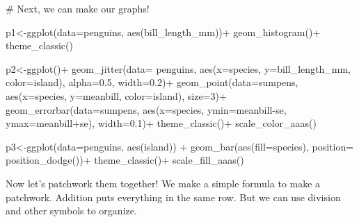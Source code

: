 \documentclass[
  letterpaper,
  DIV=11,
  numbers=noendperiod]{scrartcl}
\newenvironment{Shaded}{\begin{snugshade}}{\end{snugshade}}
\newcommand{\AttributeTok}[1]{\textcolor[rgb]{0.40,0.45,0.13}{#1}}
\newcommand{\CommentTok}[1]{\textcolor[rgb]{0.37,0.37,0.37}{#1}}
\newcommand{\DecValTok}[1]{\textcolor[rgb]{0.68,0.00,0.00}{#1}}
\newcommand{\FloatTok}[1]{\textcolor[rgb]{0.68,0.00,0.00}{#1}}
\newcommand{\FunctionTok}[1]{\textcolor[rgb]{0.28,0.35,0.67}{#1}}
\newcommand{\NormalTok}[1]{\textcolor[rgb]{0.00,0.23,0.31}{#1}}
\newcommand{\OtherTok}[1]{\textcolor[rgb]{0.00,0.23,0.31}{#1}}
\newcommand{\SpecialCharTok}[1]{\textcolor[rgb]{0.37,0.37,0.37}{#1}}
\begin{document}
\begin{Shaded}
\begin{Highlighting}[]
\CommentTok{\# Next, we can make our graphs!}

\NormalTok{p1}\OtherTok{\textless{}{-}}\FunctionTok{ggplot}\NormalTok{(}\AttributeTok{data=}\NormalTok{penguins, }\FunctionTok{aes}\NormalTok{(bill\_length\_mm))}\SpecialCharTok{+}
  \FunctionTok{geom\_histogram}\NormalTok{()}\SpecialCharTok{+}
  \FunctionTok{theme\_classic}\NormalTok{()}


\NormalTok{p2}\OtherTok{\textless{}{-}}\FunctionTok{ggplot}\NormalTok{()}\SpecialCharTok{+}
  \FunctionTok{geom\_jitter}\NormalTok{(}\AttributeTok{data=}\NormalTok{ penguins, }\FunctionTok{aes}\NormalTok{(}\AttributeTok{x=}\NormalTok{species, }\AttributeTok{y=}\NormalTok{bill\_length\_mm, }\AttributeTok{color=}\NormalTok{island), }\AttributeTok{alpha=}\FloatTok{0.5}\NormalTok{, }\AttributeTok{width=}\FloatTok{0.2}\NormalTok{)}\SpecialCharTok{+}
  \FunctionTok{geom\_point}\NormalTok{(}\AttributeTok{data=}\NormalTok{sumpens, }\FunctionTok{aes}\NormalTok{(}\AttributeTok{x=}\NormalTok{species, }\AttributeTok{y=}\NormalTok{meanbill, }\AttributeTok{color=}\NormalTok{island), }\AttributeTok{size=}\DecValTok{3}\NormalTok{)}\SpecialCharTok{+}
  \FunctionTok{geom\_errorbar}\NormalTok{(}\AttributeTok{data=}\NormalTok{sumpens, }\FunctionTok{aes}\NormalTok{(}\AttributeTok{x=}\NormalTok{species, }\AttributeTok{ymin=}\NormalTok{meanbill}\SpecialCharTok{{-}}\NormalTok{se, }\AttributeTok{ymax=}\NormalTok{meanbill}\SpecialCharTok{+}\NormalTok{se), }\AttributeTok{width=}\FloatTok{0.1}\NormalTok{)}\SpecialCharTok{+}
  \FunctionTok{theme\_classic}\NormalTok{()}\SpecialCharTok{+}
  \FunctionTok{scale\_color\_aaas}\NormalTok{()}

\NormalTok{p3}\OtherTok{\textless{}{-}}\FunctionTok{ggplot}\NormalTok{(}\AttributeTok{data=}\NormalTok{penguins, }\FunctionTok{aes}\NormalTok{(island)) }\SpecialCharTok{+}
  \FunctionTok{geom\_bar}\NormalTok{(}\FunctionTok{aes}\NormalTok{(}\AttributeTok{fill=}\NormalTok{species), }\AttributeTok{position=} \FunctionTok{position\_dodge}\NormalTok{())}\SpecialCharTok{+}
  \FunctionTok{theme\_classic}\NormalTok{()}\SpecialCharTok{+}
  \FunctionTok{scale\_fill\_aaas}\NormalTok{()}
\end{Highlighting}
\end{Shaded}

Now let's patchwork them together! We make a simple formula to make a
patchwork. Addition puts everything in the same row. But we can use
division and other symbols to organize.
\end{document}
